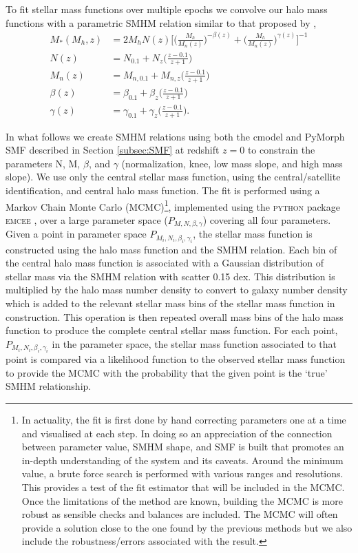 To fit stellar mass functions over multiple epochs we convolve our halo mass functions with a parametric SMHM relation similar to that proposed by \cite{Moster2010},
\begin{equation}
\label{eqn:MosAbn}
\begin{split}
M_*(M_h, z) &= 2M_hN(z)\Big[ \Big( \frac{M_h}{M_{n}(z)}\Big) ^{- \beta(z)} + \Big( \frac{M_h}{M_{n}(z)}\Big)^{\gamma(z)} \Big ]^{-1}\\
N(z) &= N_{0.1} +N_z\Big(\frac{z-0.1}{z+1}\Big)\\
M_{n}(z) &= M_{n,0.1} +M_{n,z}\Big(\frac{z-0.1}{z+1}\Big)\\
\beta(z) &= \beta_{0.1} +\beta_z\Big(\frac{z-0.1}{z+1}\Big)\\
\gamma(z) &= \gamma_{0.1} +\gamma_z\Big(\frac{z-0.1}{z+1}\Big).
\end{split}
\end{equation}

In what follows we create SMHM relations using both the cmodel and PyMorph SMF described in Section \ref{subsec:SMF} at redshift $z=0$ to constrain the parameters N, M, $\beta$, and $\gamma$ (normalization, knee, low mass slope, and high mass slope). We use only the central stellar mass function, using the \cite{Yang2012EvolutionHalos} central/satellite identification, and central halo mass function. The fit is performed using a Markov Chain Monte Carlo (MCMC)\footnote{In actuality, the fit is first done by hand correcting parameters one at a time and visualised at each step. In doing so an appreciation of the connection between parameter value, SMHM shape, and SMF is built that promotes an in-depth understanding of the system and its caveats. Around the minimum value, a brute force search is performed with various ranges and resolutions. This provides a test of the fit estimator that will be included in the MCMC. Once the limitations of the method are known, building the MCMC is more robust as sensible checks and balances are included. The MCMC will often provide a solution close to the one found by the previous methods but we also include the robustness/errors associated with the result.}, implemented using the \textsc{python} package \textsc{emcee} \citep{Foreman-Mackey2013EmceeHammer}, over a large parameter space ($P_{M, N, \beta, \gamma}$) covering all four parameters. Given a point in parameter space $P_{M_i, N_i, \beta_i, \gamma_i}$, the stellar mass function is constructed using the halo mass function and the SMHM relation. Each bin of the central halo mass function is associated with a Gaussian distribution of stellar mass via the SMHM relation with scatter 0.15 dex. This distribution is multiplied by the halo mass number density to convert to galaxy number density which is added to the relevant stellar mass bins of the stellar mass function in construction. This operation is then repeated overall mass bins of the halo mass function to produce the complete central stellar mass function. For each point, $P_{M_i, N_i, \beta_i, \gamma_i}$ in the parameter space, the stellar mass function associated to that point is compared via a likelihood function to the observed stellar mass function to provide the MCMC with the probability that the given point is the `true' SMHM relationship. 

